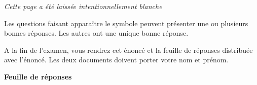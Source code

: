 \documentclass[a4paper]{article}
\begin{document}
\begin{examcopy}[1]
    \vfill
    \newpage

    \vspace{3cm}

    \begin{center}
      \textit{Cette page a été laissée intentionnellement blanche}
    \end{center}


    \newpage

    {
    \em\setlength{\parindent}{0pt}

    Les questions faisant apparaître le symbole \multiSymbole{} peuvent
      présenter une ou plusieurs bonnes réponses. Les autres ont
      une unique bonne réponse.
    \newline

    A la fin de l'examen, vous rendrez cet énoncé et la feuille de réponses distribuée avec l'énoncé.
      Les deux documents doivent porter votre nom et prénom.
    \newline


    }\hspace*{\fill}
    \vspace{1ex}

    

    \AMCcleardoublepage

    \AMCdebutFormulaire

    {\large\bf\noindent Feuille de réponses}

    {\setlength{\parindent}{0pt}\hspace*{\fill}

    \begin{minipage}[b]{6.5cm}\setlength{\parindent}{0pt}

    \vspace{1ex}


\end{minipage}}
\end{examcopy}
\end{document}
